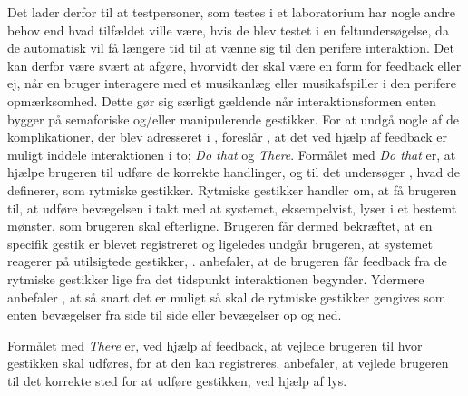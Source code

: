 Det lader derfor til at testpersoner, som testes i et laboratorium har nogle andre behov end hvad tilfældet ville være, hvis de blev testet i en feltundersøgelse, da de automatisk vil få længere tid til at vænne sig til den perifere interaktion. Det kan derfor være svært at afgøre, hvorvidt der skal være en form for feedback eller ej, når en bruger interagere med et musikanlæg eller musikafspiller i den perifere opmærksomhed. Dette gør sig særligt gældende når interaktionsformen enten bygger på semaforiske og/eller manipulerende gestikker. \blankline 
%
For at undgå nogle af de komplikationer, der blev adresseret i , foreslår \textcite{PDF:DoThatThere}, at det ved hjælp af feedback er muligt inddele interaktionen i to; \textit{Do that} og \textit{There}. Formålet med \textit{Do that} er, at hjælpe brugeren til udføre de korrekte handlinger, og til det undersøger \textcite[s. 4]{PDF:DoThatThere}, hvad de definerer, som rytmiske gestikker. Rytmiske gestikker handler om, at få brugeren til, at udføre bevægelsen i takt med at systemet, eksempelvist, lyser i et bestemt mønster, som brugeren skal efterligne. Brugeren får dermed bekræftet, at en specifik gestik er blevet registreret og ligeledes undgår brugeren, at systemet reagerer på utilsigtede gestikker, \parencite[s. 4]{PDF:DoThatThere}. \textcite[s. 10]{PDF:DoThatThere} anbefaler, at de brugeren får feedback fra de rytmiske gestikker lige fra det tidspunkt interaktionen begynder. Ydermere anbefaler \textcite[s. 10]{PDF:DoThatThere}, at så snart det er muligt så skal de rytmiske gestikker gengives som enten bevægelser fra side til side eller bevægelser op og ned. 

Formålet med \textit{There} er, ved hjælp af feedback, at vejlede brugeren til hvor gestikken skal udføres, for at den kan registreres. \textcite[s. 10]{PDF:DoThatThere} anbefaler, at vejlede brugeren til det korrekte sted for at udføre gestikken, ved hjælp af lys. 






  

